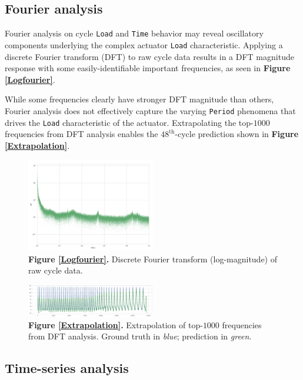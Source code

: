 \documentclass[letterpaper, 10 pt, conference]{ieeeconf}  %
\begin{document}
\subsection{Fourier analysis}
Fourier analysis on cycle \verb|Load| and \verb|Time| behavior may reveal oscillatory components underlying the complex actuator \verb|Load| characteristic. Applying a discrete Fourier transform (DFT) to raw cycle data results in a DFT magnitude response with some easily-identifiable important frequencies, as seen in \textbf{Figure \ref{Logfourier}}.

While some frequencies clearly have stronger DFT magnitude than others, Fourier analysis does not effectively capture the varying \verb|Period| phenomena that drives the \verb|Load| characteristic of the actuator. Extrapolating the top-$1000$ frequencies from DFT analysis enables the $48^{\text{th}}$-cycle prediction shown in \textbf{Figure \ref{Extrapolation}}.

\label{Logfourier}
\begin{figure}[h]
	\centering
	\includegraphics[width=0.5\textwidth]{assets/fourier_analysis.png}
  \caption*{\textbf{Figure \ref{Logfourier}.} Discrete Fourier transform (log-magnitude) of raw cycle data.}
\end{figure}

\label{Extrapolation}
\begin{figure}[h]
	\centering
	\includegraphics[width=0.5\textwidth]{assets/fourier_extrapolation.png}
  \caption*{\textbf{Figure \ref{Extrapolation}.} Extrapolation of top-$1000$ frequencies from DFT analysis. Ground truth in \textit{blue}; prediction in \textit{green}.}
\end{figure}

\subsection{Time-series analysis}
\end{document}
